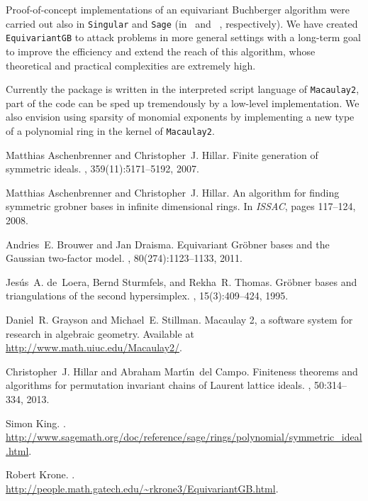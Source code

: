 \documentclass[10pt]{amsart}
\theoremstyle{definition}
\theoremstyle{remark}
\numberwithin{equation}{section}
\newcommand{\<}{\langle}
\renewcommand{\>}{\rangle}
\begin{document}
Proof-of-concept implementations of an equivariant Buchberger algorithm were carried out also in {\tt Singular} and {\tt Sage} (in~\cite{Aschenbrenner-Hillar:ISSAC} and ~\cite{SAGE:symmetric-GB}, respectively). We have created {\tt EquivariantGB} to attack problems in more general settings with a long-term goal to improve the efficiency and extend the reach of this algorithm, whose theoretical and practical complexities are extremely high.

Currently the package is written in the interpreted script language of {\tt Macaulay2}, part of the code can be sped up tremendously by a low-level implementation. We also envision using sparsity of monomial exponents by implementing a new type of a polynomial ring in the kernel of {\tt Macaulay2}.


%

\def\cprime{$'$}
\begin{thebibliography}{1}

Matthias Aschenbrenner and Christopher~J. Hillar.
\newblock Finite generation of symmetric ideals.
, 359(11):5171--5192, 2007.

Matthias Aschenbrenner and Christopher~J. Hillar.
\newblock An algorithm for finding symmetric grobner bases in infinite
  dimensional rings.
\newblock In {\em ISSAC}, pages 117--124, 2008.

Andries~E. Brouwer and Jan Draisma.
\newblock Equivariant {G}r\"obner bases and the {G}aussian two-factor model.
, 80(274):1123--1133, 2011.

Jes{\'u}s~A. de~Loera, Bernd Sturmfels, and Rekha~R. Thomas.
\newblock Gr\"obner bases and triangulations of the second hypersimplex.
, 15(3):409--424, 1995.

Daniel~R. Grayson and Michael~E. Stillman.
\newblock Macaulay 2, a software system for research in algebraic geometry.
\newblock Available at \url{http://www.math.uiuc.edu/Macaulay2/}.

Christopher~J. Hillar and Abraham Mart{\'{\i}}n~del Campo.
\newblock Finiteness theorems and algorithms for permutation invariant chains
  of {L}aurent lattice ideals.
, 50:314--334, 2013.

Simon King.
.
\newblock
  \\ \url{http://www.sagemath.org/doc/reference/sage/rings/polynomial/symmetric_ideal.html}.

Robert Krone.
.
\newblock \\ \url{http://people.math.gatech.edu/~rkrone3/EquivariantGB.html}.

\end{thebibliography}
\end{document}
